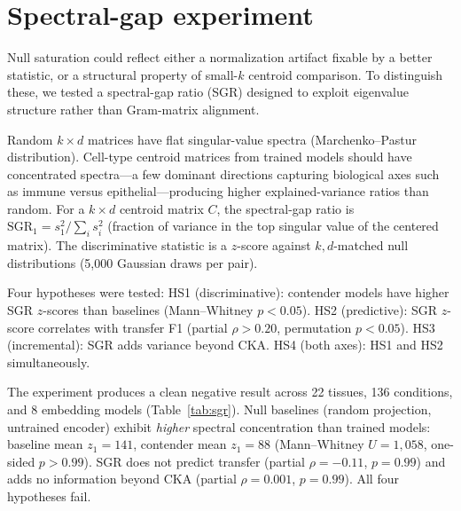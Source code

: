 \documentclass[11pt]{article}
\begin{document}
\section{Spectral-gap experiment}
\label{app:spectral}

Null saturation could reflect either a normalization artifact fixable by
a better statistic, or a structural property of small-$k$ centroid
comparison. To distinguish these, we tested a spectral-gap ratio (SGR)
designed to exploit eigenvalue structure rather than Gram-matrix
alignment.

Random $k \times d$ matrices have flat singular-value spectra
(Marchenko--Pastur distribution). Cell-type centroid matrices from
trained models should have concentrated spectra---a few dominant
directions capturing biological axes such as immune versus
epithelial---producing higher explained-variance ratios than random.
For a $k \times d$ centroid matrix $C$, the spectral-gap ratio is
$\mathrm{SGR}_1 = s_1^2 / \sum_i s_i^2$ (fraction of variance in the
top singular value of the centered matrix). The discriminative
statistic is a $z$-score against $k,d$-matched null distributions
(5,000 Gaussian draws per pair).

Four hypotheses were tested: HS1
(discriminative): contender models have higher SGR $z$-scores than
baselines (Mann--Whitney $p < 0.05$). HS2 (predictive): SGR $z$-score
correlates with transfer F1 (partial $\rho > 0.20$, permutation
$p < 0.05$). HS3 (incremental): SGR adds variance beyond CKA. HS4
(both axes): HS1 and HS2 simultaneously.

The experiment produces a clean negative result across 22 tissues,
136 conditions, and 8 embedding models (Table~\ref{tab:sgr}). Null
baselines (random projection, untrained encoder) exhibit \emph{higher}
spectral concentration than trained models: baseline mean $z_1 = 141$,
contender mean $z_1 = 88$ (Mann--Whitney $U = 1{,}058$, one-sided
$p > 0.99$). SGR does not predict transfer (partial $\rho = -0.11$,
$p = 0.99$) and adds no information beyond CKA (partial
$\rho = 0.001$, $p = 0.99$). All four hypotheses fail.
\end{document}
